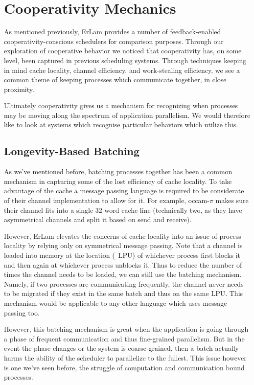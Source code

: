 \section{Cooperativity Mechanics}\label{sec:cooperativity mechanics}

As mentioned previously, ErLam provides a number of feedback-enabled 
cooperativity-conscious schedulers for comparison purposes. Through our 
exploration of cooperative behavior we noticed that
cooperativity has, on some level, been captured in previous scheduling systems.
Through techniques keeping in mind cache locality, channel efficiency,
and work-stealing efficiency, we see a common theme of keeping processes which
communicate together, in close proximity. 

Ultimately cooperativity gives us a mechanism for recognizing when processes 
may be moving along the spectrum of application parallelism. We would therefore 
like to look at systems which recognise particular behaviors which utilize this.

\subsection{Longevity-Based Batching}\label{sec:longevity based batching}

As we've mentioned before, batching processes together has been a common 
mechanism in capturing some of the lost efficiency of cache locality. To take
advantage of the cache a message passing language is required to be considerate 
of their channel implementation to allow for it. For example, occam-$\pi$ makes sure
their channel fits into a single 32 word cache line (technically two, as they
have asymmetrical channels and split it based on send and receive).

However, ErLam elevates the concerns of cache locality into an issue of process 
locality by relying only on symmetrical message passing. Note that 
a channel is loaded into memory at the location (\ie~LPU) of whichever process 
first blocks it and then again at whichever process unblocks it. Thus to reduce
the number of times the channel needs to be loaded, we can still use the 
batching mechanism. Namely, if two processes are communicating frequently, the
channel never needs to be migrated if they exist in the same batch and thus on the
same LPU. This mechanism would be applicable to any other language which uses 
message passing too.

However, this batching mechanism is great when the application is going through
a phase of frequent communication and thus fine-grained parallelism. But in the
event the phase changes or the system is coarse-grained, then a batch actually
harms the ability of the scheduler to parallelize to the fullest. This issue 
however is one we've seen before, the struggle of computation and communication
bound processes.

